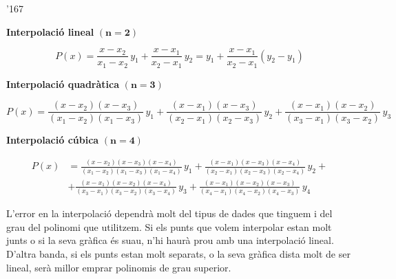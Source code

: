 \begin{dinglist}{'167}
    \item \textbf{Interpolaci\'{o} lineal} $\boldsymbol{(n=2)}$ 

    \begin{equation}\label{eq:interp_lin}
      P(x) = \frac{x-x_2}{x_1-x_2}\, y_1 + \frac{x-x_1}{x_2-x_1}\, y_2 = y_1 + \frac{x-x_1}{x_2-x_1} (y_2-y_1)
    \end{equation}

    \item \textbf{Interpolaci\'{o} quadr\`{a}tica} $\boldsymbol{(n=3)}$ 

    \begin{equation}
      P(x) = \frac{(x-x_2)(x-x_3)}{(x_1-x_2)(x_1-x_3)}\, y_1 + \frac{(x-x_1)(x-x_3)}{(x_2-x_1)(x_2-x_3)}\, y_2 +
      \frac{(x-x_1)(x-x_2)}{(x_3-x_1)(x_3-x_2)}\, y_3
    \end{equation}

    \item \textbf{Interpolaci\'{o} c\'{u}bica} $\boldsymbol{(n=4)}$ 

    \begin{equation}\begin{split}\label{eq:interp_cub}
      P(x) &= \frac{(x-x_2)(x-x_3)(x-x_4)}{(x_1-x_2)(x_1-x_3)(x_1-x_4)}\, y_1 +
              \frac{(x-x_1)(x-x_3)(x-x_4)}{(x_2-x_1)(x_2-x_3)(x_2-x_4)}\, y_2 + {} \\[1.5ex]
           &+ \frac{(x-x_1)(x-x_2)(x-x_4)}{(x_3-x_1)(x_3-x_2)(x_3-x_4)}\, y_3 +
              \frac{(x-x_1)(x-x_2)(x-x_3)}{(x_4-x_1)(x_4-x_2)(x_4-x_3)}\, y_4
    \end{split}\end{equation}
\end{dinglist}


L'error en la interpolaci\'{o} dependr\`{a} molt del tipus de dades que tinguem i del grau del polinomi que utilitzem. Si els punts que volem interpolar estan molt junts o si la seva gr\`{a}fica \'{e}s suau, n'hi haur\`{a} prou amb una interpolaci\'{o} lineal. D'altra banda, si els punts estan molt separats, o la seva gr\`{a}fica dista molt de ser lineal, ser\`{a} millor emprar polinomis de grau superior.


